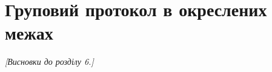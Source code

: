 \section{Груповий протокол в окреслених межах}
\label{sec:e2ee-group}

\emph{[Висновки до розділу 6.]}
